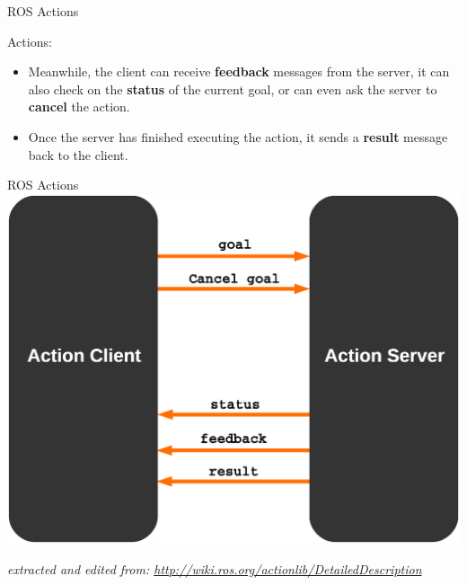 \documentclass{beamer}
\begin{document}
\begin{frame}{ROS Actions}
    
    {\huge Actions:}
    \vspace{0.2cm}
    \begin{itemize}

        
        \item Meanwhile, the client can receive \textbf{feedback} messages from the server, it can also check on the \textbf{status} of the current goal, or can even ask the server to \textbf{cancel} the action.
        
        \vspace{2mm}
        
        \item Once the server has finished executing the action, it sends a \textbf{result} message back to the client.
    \end{itemize}  
\end{frame}


\begin{frame}{ROS Actions}
 \centering
 \includegraphics[width =0.75\linewidth]{figures/actions.eps}
  
  \vspace{5mm}
 \tiny{\textit{extracted and edited from:       
   \href{http://wiki.ros.org/actionlib/DetailedDescription}{http://wiki.ros.org/actionlib/DetailedDescription}  }}                                                         
\end{frame} 
\end{document}
